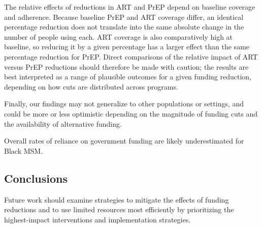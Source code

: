 \documentclass[preprint,12pt]{elsarticle}
\begin{document}

The relative effects of reductions in ART and PrEP depend on baseline coverage and adherence. Because baseline PrEP and ART coverage differ, an identical percentage reduction does not translate into the same absolute change in the number of people using each. ART coverage is also comparatively high at baseline, so reducing it by a given percentage has a larger effect than the same percentage reduction for PrEP. Direct comparisons of the relative impact of ART versus PrEP reductions should therefore be made with caution; the results are best interpreted as a range of plausible outcomes for a given funding reduction, depending on how cuts are distributed across programs.

Finally, our findings may not generalize to other populations or settings, and could be more or less optimistic depending on the magnitude of funding cuts and the availability of alternative funding.

Overall rates of reliance on government funding are likely underestimated for Black MSM. 

\subsection{Conclusions}
\label{sec:conclusions}

Future work should examine strategies to mitigate the effects of funding reductions and to use limited resources most efficiently by prioritizing the highest-impact interventions and implementation strategies. %

\appendix
\newcommand{\suppstandalone}{0}

\end{document}
